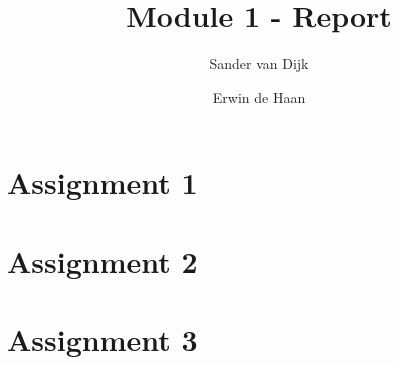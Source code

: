 \documentclass[final]{scrartcl} %
\title{Module 1 - Report}
\author{Sander {van Dijk} \and Erwin {de Haan}}
\begin{document}
\maketitle

\section{Assignment 1}
\section{Assignment 2}
\section{Assignment 3}
\end{document}
